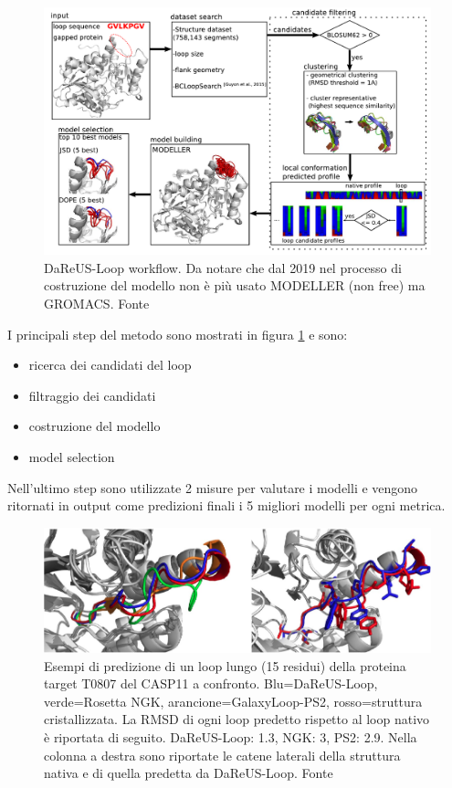 \begin{figure}[!htb]
	\centering
	\includegraphics[scale=0.45]{images/dareus.png}
	\caption{DaReUS-Loop workflow. Da notare che dal 2019\supercite{karamiLoop} nel processo di costruzione del modello non è più usato MODELLER (non free) ma GROMACS. Fonte\cite{karami2018dareus}}
	\label{fig:dareus-workflow}
\end{figure}

I principali step del metodo sono mostrati in figura \ref{fig:dareus-workflow} e sono:
\begin{itemize}
	\item ricerca dei candidati del loop
	\item filtraggio dei candidati
	\item costruzione del modello
	\item model selection
\end{itemize}

Nell'ultimo step sono utilizzate 2 misure per valutare i modelli e vengono ritornati in output come predizioni finali i 5 migliori modelli per ogni metrica.

\begin{figure}[!htb]
	\centering
	\includegraphics[scale=0.63]{images/dareus-confronto.png}
	\caption{Esempi di predizione di un loop lungo (15 residui) della proteina target T0807 del CASP11 a confronto. Blu=DaReUS-Loop, verde=Rosetta NGK, arancione=GalaxyLoop-PS2, rosso=struttura cristallizzata. La RMSD di ogni loop predetto rispetto al loop nativo è riportata di seguito. DaReUS-Loop: 1.3\angstrom, NGK: 3\angstrom, PS2: 2.9\angstrom. Nella colonna a destra sono riportate le catene laterali della struttura nativa e di quella predetta da DaReUS-Loop. Fonte\cite{karami2018dareus}}
	\label{fig:}
\end{figure}

